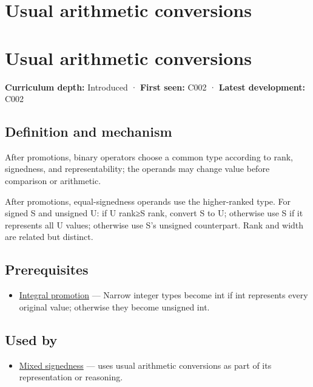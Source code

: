 \hypertarget{appendix-5e2d663adf7f}{}
\section*{Usual arithmetic conversions}
\section{Usual arithmetic conversions}\label{usual-arithmetic-conversions}

\textbf{Curriculum depth:} Introduced · \textbf{First seen:} C002 · \textbf{Latest development:} C002

\subsection{Definition and mechanism}\label{definition-and-mechanism}

After promotions, binary operators choose a common type according to rank, signedness, and representability; the operands may change value before comparison or arithmetic.

After promotions, equal-signedness operands use the higher-ranked type. For signed S and unsigned U: if U rank≥S rank, convert S to U; otherwise use S if it represents all U values; otherwise use S's unsigned counterpart. Rank and width are related but distinct.

\subsection{Prerequisites}\label{prerequisites}

\begin{itemize}
\tightlist
\item
  \hyperref[appendix-45303d03796a]{Integral promotion} --- Narrow integer types become int if int represents every original value; otherwise they become unsigned int.
\end{itemize}

\subsection{Used by}\label{used-by}

\begin{itemize}
\tightlist
\item
  \hyperref[appendix-736a2345de4a]{Mixed signedness} --- uses usual arithmetic conversions as part of its representation or reasoning.
\end{itemize}

